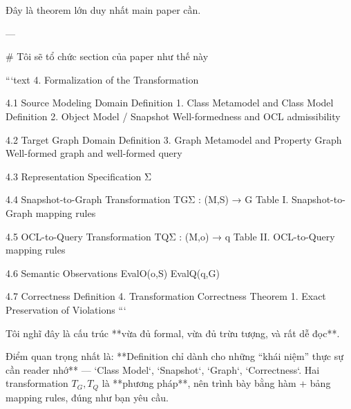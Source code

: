 Đây là theorem lớn duy nhất main paper cần.

---

# Tôi sẽ tổ chức section của paper như thế này

```text
4. Formalization of the Transformation

4.1 Source Modeling Domain
    Definition 1. Class Metamodel and Class Model
    Definition 2. Object Model / Snapshot
    Well-formedness and OCL admissibility

4.2 Target Graph Domain
    Definition 3. Graph Metamodel and Property Graph
    Well-formed graph and well-formed query

4.3 Representation Specification
    Σ

4.4 Snapshot-to-Graph Transformation
    TGΣ : (M,S) → G
    Table I. Snapshot-to-Graph mapping rules

4.5 OCL-to-Query Transformation
    TQΣ : (M,o) → q
    Table II. OCL-to-Query mapping rules

4.6 Semantic Observations
    EvalO(o,S)
    EvalQ(q,G)

4.7 Correctness
    Definition 4. Transformation Correctness
    Theorem 1. Exact Preservation of Violations
```

Tôi nghĩ đây là cấu trúc **vừa đủ formal, vừa đủ trừu tượng, và rất dễ đọc**.

Điểm quan trọng nhất là: **Definition chỉ dành cho những “khái niệm” thực sự cần reader nhớ** — `Class Model`, `Snapshot`, `Graph`, `Correctness`. Hai transformation \(T_G,T_Q\) là **phương pháp**, nên trình bày bằng hàm + bảng mapping rules, đúng như bạn yêu cầu.
